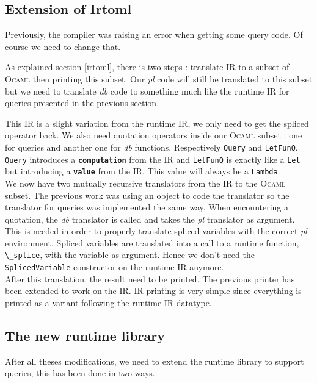 \documentclass[11pt]{article}
\newcommand\mysc[1]{{\rmfamily\textsc{#1}}\xspace}
\newcommand\ocaml{\mysc{Ocaml}}
\newcommand\refsec[1]{\hyperref[#1]{section \ref*{#1}}}
\newcommand\sig[1]{{\tt\bf #1}}
\newcommand\effect[1]{{\em #1}}
\newcommand\ocamlc[1]{\lstinline[language={[Objective]Caml},basicstyle=\ttfamily\normalsize]{#1}}
\newcommand\module[1]{{\bf #1}}
\begin{document}
\subsection{Extension of \module{Irtoml}}

Previously, the compiler was raising an error when getting some query code. Of course we need to change that.

As explained \refsec{irtoml}, there is two steps : translate IR to a subset of \ocaml then printing this subset. Our \effect{pl} code will still be translated to this subset but we need to translate \effect{db} code to something much like the runtime IR for queries presented in the previous section.

This IR is a slight variation from the runtime IR, we only need to get the spliced operator back. We also need quotation operators inside our \ocaml subset : one for queries and another one for \effect{db} functions. Respectively \ocamlc{Query} and \ocamlc{LetFunQ}.\\
\ocamlc{Query} introduces a \sig{computation} from the IR and \ocamlc{LetFunQ} is exactly like a \ocamlc{Let} but introducing a \sig{value} from the IR. This value will always be a \ocamlc{Lambda}.\\

We now have two mutually recursive translators from the IR to the \ocaml subset. The previous work was using an object to code the translator so the translator for queries was implemented the same way. When encountering a quotation, the \effect{db} translator is called and takes the \effect{pl} translator as argument. This is needed in order to properly translate spliced variables with the correct \effect{pl} environment.
Spliced variables are translated into a call to a runtime function, \ocamlc{\_splice}, with the variable as argument. Hence we don't need the \ocamlc{SplicedVariable} constructor on the runtime IR anymore.\\

After this translation, the result need to be printed. The previous printer has been extended to work on the IR. IR printing is very simple since everything is printed as a variant following the runtime IR datatype.

\subsection{The new runtime library}

After all theses modifications, we need to extend the runtime library to support queries, this has been done in two ways. 
\end{document}
